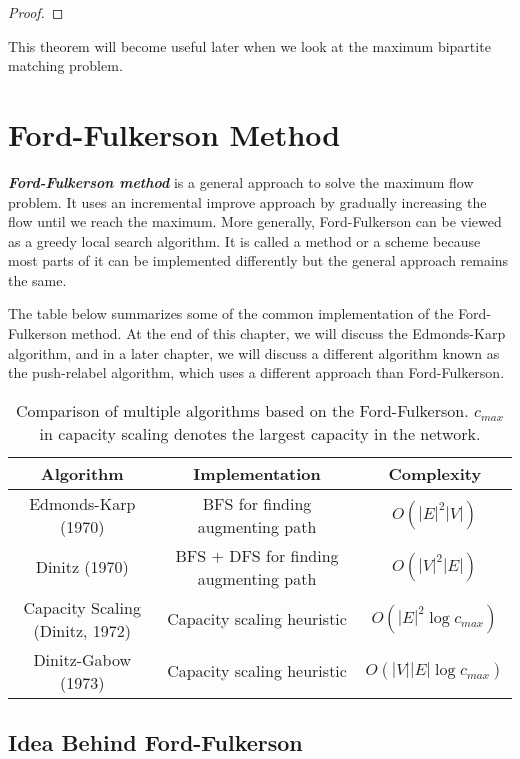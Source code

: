 \begin{proof}
    
\end{proof}

This theorem will become useful later when we look at the maximum bipartite matching problem.

\section{Ford-Fulkerson Method} 

\textit{\textbf{Ford-Fulkerson method}} is a general approach to solve the maximum flow problem. It uses an incremental improve approach by gradually increasing the flow until we reach the maximum. More generally, Ford-Fulkerson can be viewed as a greedy local search algorithm. It is called a method or a scheme because most parts of it can be implemented differently but the general approach remains the same.

The table below summarizes some of the common implementation of the Ford-Fulkerson method. At the end of this chapter, we will discuss the Edmonds-Karp algorithm, and in a later chapter, we will discuss a different algorithm known as the push-relabel algorithm, which uses a different approach than Ford-Fulkerson.

\begin{table}[htpb]
    \centering
    \begin{tabular}{c|c|c}
    Algorithm & Implementation & Complexity \\
    \hline
    Edmonds-Karp (1970) & BFS for finding augmenting path & $O(|E|^2|V|)$ \\
    Dinitz (1970) & BFS + DFS for finding augmenting path & $O(|V|^2 |E|)$ \\
    Capacity Scaling (Dinitz, 1972) & Capacity scaling heuristic & $O(|E|^2 \log c_{max})$ \\
    Dinitz-Gabow (1973) & Capacity scaling heuristic & $O(|V||E| \log c_{max})$ 
    \end{tabular}
    \caption{Comparison of multiple algorithms based on the Ford-Fulkerson. $c_{max}$ in capacity scaling denotes the largest capacity in the network.}
    \label{tab:ford-fulkerson}
\end{table}

\subsection{Idea Behind Ford-Fulkerson}

